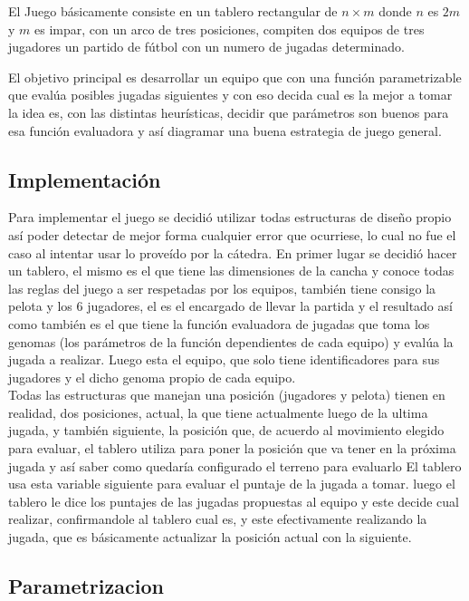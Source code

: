 
El Juego básicamente consiste en un tablero rectangular de $n \times m$ donde
$n$ es $2m$ y $m$ es impar, con un arco de tres posiciones, compiten dos equipos
de tres jugadores un partido de fútbol con un numero de jugadas determinado.


El objetivo principal es desarrollar un equipo que con una función parametrizable
que evalúa posibles jugadas siguientes y con eso decida cual es la mejor a tomar
la idea es, con las distintas heurísticas, decidir que parámetros son buenos para esa
función evaluadora y así diagramar una buena estrategia de juego general.\\

\subsection{Implementación}


Para implementar el juego se decidió utilizar todas estructuras de diseño propio así poder
detectar de mejor forma cualquier error que ocurriese, lo cual no fue el caso al intentar
usar lo proveído por la cátedra.
En primer lugar se decidió hacer un tablero, el mismo es el que tiene las dimensiones de la cancha y
conoce todas las reglas del juego a ser respetadas por los equipos, también tiene consigo la pelota y los
6 jugadores, el es el encargado de llevar la partida y el resultado así como también es el que tiene la
función evaluadora de jugadas que toma los genomas (los parámetros de la función dependientes de cada equipo)
y evalúa la jugada a realizar.
Luego esta el equipo, que solo tiene identificadores para sus jugadores y el dicho genoma propio de cada equipo.\\


Todas las estructuras que manejan una posición (jugadores y pelota) tienen en realidad, dos posiciones, actual, la que
tiene actualmente luego de la ultima jugada, y también siguiente, la posición que, de acuerdo al
movimiento elegido para evaluar, el tablero utiliza para poner la posición que va tener en la próxima jugada y así
saber como quedaría configurado el terreno para evaluarlo
El tablero usa esta variable siguiente para evaluar el puntaje de la jugada a tomar.
luego el tablero le dice los puntajes de las jugadas propuestas al equipo y este decide cual realizar, confirmandole
al tablero cual es, y este efectivamente realizando la jugada, que es básicamente actualizar la posición actual
con la siguiente.\\

\subsection{Parametrizacion}

